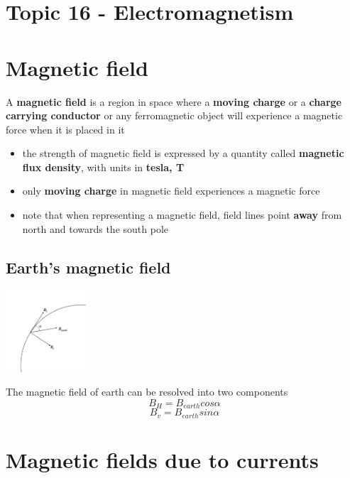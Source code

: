 \documentclass[a4paper, 10pt]{article}
\begin{document}
\section*{Topic 16 - Electromagnetism}

\section{Magnetic field}
\begin{framed}
   A \textbf{magnetic field} is a region in space where a \textbf{moving charge} or a \textbf{charge carrying conductor} or any ferromagnetic object will experience a magnetic force when it is placed in it
\end{framed}	
\begin{itemize}
   \item the strength of magnetic field is expressed by a quantity called \textbf{magnetic flux density}, with units in \textbf{tesla, T}
   \item only \textbf{moving charge} in magnetic field experiences a magnetic force
   \item note that when representing a magnetic field, field lines point \textbf{away} from north and towards the south pole
\end{itemize}	

\subsection*{Earth's magnetic field}
\begin{center}
   \includegraphics[width=3cm]{figures/1.pdf} 
\end{center}	

The magnetic field of earth can be resolved into two components
\[
   B_H = B_{earth} cos \alpha
\]
\[
   B_v = B_{earth} sin \alpha
\]

\section{Magnetic fields due to currents}
\end{document}
